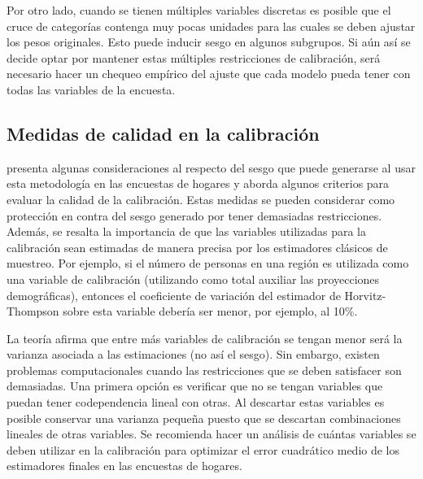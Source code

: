 \documentclass[
  12pt,
]{book}
\begin{document}
Por otro lado, cuando se tienen múltiples variables discretas es posible que el cruce de categorías contenga muy pocas unidades para las cuales se deben ajustar los pesos originales. Esto puede inducir sesgo en algunos subgrupos. Si aún así se decide optar por mantener estas múltiples restricciones de calibración, será necesario hacer un chequeo empírico del ajuste que cada modelo pueda tener con todas las variables de la encuesta.

\hypertarget{medidas-de-calidad-en-la-calibraciuxf3n}{%
\subsection{Medidas de calidad en la calibración}\label{medidas-de-calidad-en-la-calibraciuxf3n}}

\citet{Silva_2004} presenta algunas consideraciones al respecto del sesgo que puede generarse al usar esta metodología en las encuestas de hogares y aborda algunos criterios para evaluar la calidad de la calibración. Estas medidas se pueden considerar como protección en contra del sesgo generado por tener demasiadas restricciones. Además, se resalta la importancia de que las variables utilizadas para la calibración sean estimadas de manera precisa por los estimadores clásicos de muestreo. Por ejemplo, si el número de personas en una región es utilizada como una variable de calibración (utilizando como total auxiliar las proyecciones demográficas), entonces el coeficiente de variación del estimador de Horvitz-Thompson sobre esta variable debería ser menor, por ejemplo, al 10\%.

La teoría afirma que entre más variables de calibración se tengan menor será la varianza asociada a las estimaciones (no así el sesgo). Sin embargo, existen problemas computacionales cuando las restricciones que se deben satisfacer son demasiadas. Una primera opción es verificar que no se tengan variables que puedan tener codependencia lineal con otras. Al descartar estas variables es posible conservar una varianza pequeña puesto que se descartan combinaciones lineales de otras variables. Se recomienda hacer un análisis de cuántas variables se deben utilizar en la calibración para optimizar el error cuadrático medio de los estimadores finales en las encuestas de hogares.
\end{document}
